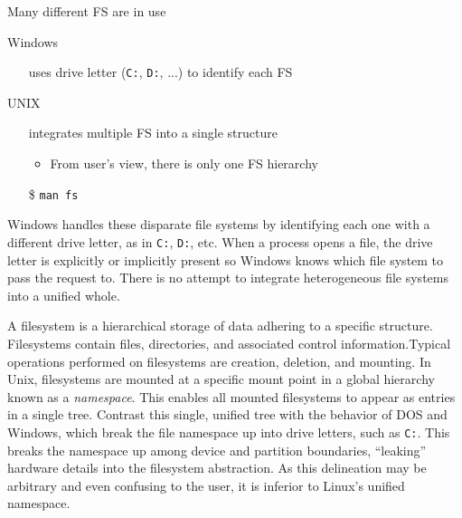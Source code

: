 \begin{frame}{Many different FS are in use}
  \begin{block}{Windows}
    \begin{itemize}
    \item[] uses drive letter (\texttt{C:}, \texttt{D:}, ...) to identify each FS
    \end{itemize}
  \end{block}
  \begin{block}{UNIX}
    \begin{itemize}
    \item[] integrates multiple FS into a single structure
      \begin{itemize}
      \item From user's view, there is only one FS hierarchy
      \end{itemize}
    \end{itemize}
  \end{block}
  \begin{itemize}
    \item[\$] \texttt{man fs}
  \end{itemize}
\end{frame}

Windows handles these disparate file systems by identifying each one with a different
drive letter, as in \texttt{C:}, \texttt{D:}, etc. When a process opens a file, the drive
letter is explicitly or implicitly present so Windows knows which file system to pass the
request to. There is no attempt to integrate heterogeneous file systems into a unified
whole.

A filesystem is a hierarchical storage of data adhering to a specific
structure. Filesystems contain files, directories, and associated control
information.Typical operations performed on filesystems are creation, deletion, and
mounting. In Unix, filesystems are mounted at a specific mount point in a global hierarchy
known as a \emph{namespace}. This enables all mounted filesystems to appear as entries in
a single tree. Contrast this single, unified tree with the behavior of DOS and Windows,
which break the file namespace up into drive letters, such as \texttt{C:}. This breaks the
namespace up among device and partition boundaries, ``leaking'' hardware details into the
filesystem abstraction. As this delineation may be arbitrary and even confusing to the
user, it is inferior to Linux's unified namespace.

